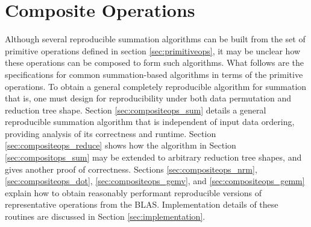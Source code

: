 \section{Composite Operations}
  \label{sec:compositeops}
  Although several reproducible summation algorithms can be built from the set of primitive operations defined in section \ref{sec:primitiveops}, it may be unclear how these operations can be composed to form such algorithms. What follows are the specifications for common summation-based algorithms in terms of the primitive operations.
  To obtain a general completely reproducible algorithm for summation that is, one must design for reproducibility under both data permutation and reduction tree shape.
  Section \ref{sec:compositeops_sum} details a general reproducible summation algorithm that is independent of input data ordering, providing analysis of its correctness and runtime. Section \ref{sec:compositeops_reduce} shows how the algorithm in Section \ref{sec:compositops_sum} may be extended to arbitrary reduction tree shapes, and gives another proof of correctness. Sections \ref{sec:compositeops_nrm}, \ref{sec:compositeops_dot}, \ref{sec:compositeops_gemv}, and \ref{sec:compositeops_gemm} explain how to obtain reasonably performant reproducible versions of representative operations from the BLAS.
  Implementation details of these routines are discussed in Section \ref{sec:implementation}.

